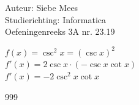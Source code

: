 \documentclass[a4paper]{article}
\begin{document}
  
\noindent \large Auteur: Siebe Mees \\
\noindent \large Studierichting: Informatica\\
\noindent \large Oefeningenreeks 3A nr. 23.19\\

\medskip

\normalsize

$f(x)=\csc^2 x=(\csc x)^2$\\

$f'(x)=2\csc x\cdot(-\csc x\cot x)$\\

$f'(x)=-2\csc^2 x\cot x$\\

\begin{thebibliography}{999}
\end{thebibliography}
\end{document}
